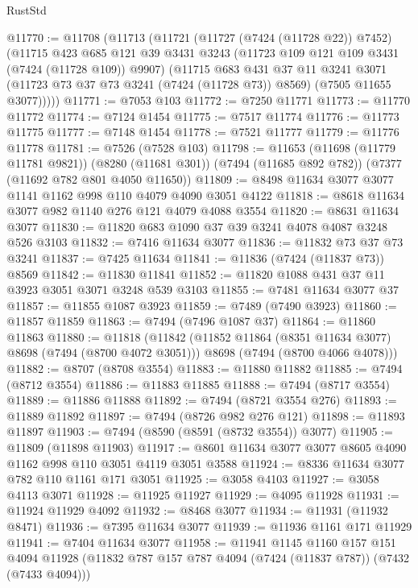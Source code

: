 \begin{lexlean}{RustStd}
\begin{coremodule}
@11770 := @11708
    (@11713
      (@11721
        (@11727 (@7424 (@11728 @22)) @7452)
        (@11715
          @423
          @685
          @121
          @39
          @3431
          @3243
          (@11723 @109 @121 @109 @3431 (@7424 (@11728 @109)) @9907)
          (@11715
            @683
            @431
            @37
            @11
            @3241
            @3071
            (@11723 @73 @37 @73 @3241 (@7424 (@11728 @73)) @8569)
            (@7505 @11655 @3077)))))
@11771 := @7053 @103
@11772 := @7250 @11771
@11773 := @11770 @11772
@11774 := @7124 @1454
@11775 := @7517 @11774
@11776 := @11773 @11775
@11777 := @7148 @1454
@11778 := @7521 @11777
@11779 := @11776 @11778
@11781 := @7526 (@7528 @103)
@11798 := @11653
    (@11698 (@11779 @11781 @9821))
    (@8280 (@11681 @301))
    (@7494 (@11685 @892 @782))
    (@7377 (@11692 @782 @801 @4050 @11650))
@11809 := @8498 @11634 @3077 @3077 @1141 @1162 @998 @110 @4079 @4090 @3051 @4122
@11818 := @8618 @11634 @3077 @982 @1140 @276 @121 @4079 @4088 @3554
@11820 := @8631 @11634 @3077
@11830 := @11820 @683 @1090 @37 @39 @3241 @4078 @4087 @3248 @526 @3103
@11832 := @7416 @11634 @3077
@11836 := @11832 @73 @37 @73 @3241
@11837 := @7425 @11634
@11841 := @11836 (@7424 (@11837 @73)) @8569
@11842 := @11830 @11841
@11852 := @11820 @1088 @431 @37 @11 @3923 @3051 @3071 @3248 @539 @3103
@11855 := @7481 @11634 @3077 @37
@11857 := @11855 @1087 @3923
@11859 := @7489 (@7490 @3923)
@11860 := @11857 @11859
@11863 := @7494 (@7496 @1087 @37)
@11864 := @11860 @11863
@11880 := @11818
    (@11842
      (@11852 @11864 (@8351 @11634 @3077) @8698 (@7494 (@8700 @4072 @3051)))
      @8698
      (@7494 (@8700 @4066 @4078)))
@11882 := @8707 (@8708 @3554)
@11883 := @11880 @11882
@11885 := @7494 (@8712 @3554)
@11886 := @11883 @11885
@11888 := @7494 (@8717 @3554)
@11889 := @11886 @11888
@11892 := @7494 (@8721 @3554 @276)
@11893 := @11889 @11892
@11897 := @7494 (@8726 @982 @276 @121)
@11898 := @11893 @11897
@11903 := @7494 (@8590 (@8591 (@8732 @3554)) @3077)
@11905 := @11809 (@11898 @11903)
@11917 := @8601 @11634 @3077 @3077 @8605 @4090 @1162 @998 @110 @3051 @4119 @3051 @3588
@11924 := @8336 @11634 @3077 @782 @110 @1161 @171 @3051
@11925 := @3058 @4103
@11927 := @3058 @4113 @3071
@11928 := @11925 @11927
@11929 := @4095 @11928
@11931 := @11924 @11929 @4092
@11932 := @8468 @3077
@11934 := @11931 (@11932 @8471)
@11936 := @7395 @11634 @3077
@11939 := @11936 @1161 @171 @11929
@11941 := @7404 @11634 @3077
@11958 := @11941
    @1145
    @1160
    @157
    @151
    @4094
    @11928
    (@11832 @787 @157 @787 @4094 (@7424 (@11837 @787)) (@7432 (@7433 @4094)))

\end{coremodule}
\end{lexlean}
